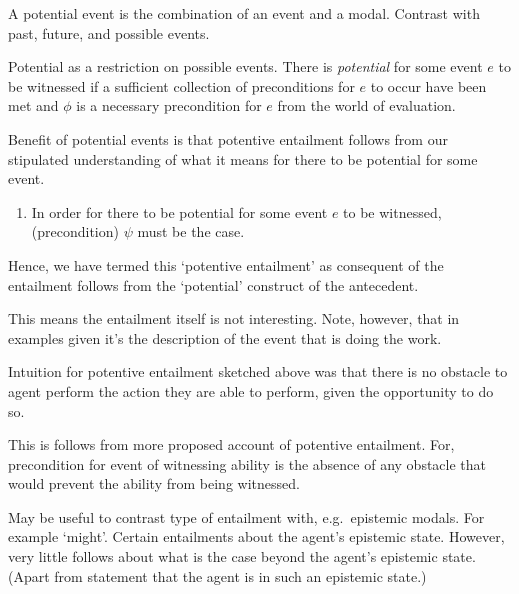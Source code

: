 \begin{note}
  A potential event is the combination of an event and a modal.
  Contrast with past, future, and possible events.

  Potential as a restriction on possible events.
  There is \emph{potential} for some event \(e\) to be witnessed if a sufficient collection of preconditions for \(e\) to occur have been met and \(\phi\) is a necessary precondition for \(e\) from the world of evaluation.
\end{note}

\begin{note}
  Benefit of potential events is that potentive entailment follows from our stipulated understanding of what it means for there to be potential for some event.
  \begin{enumerate}
  \item In order for there to be potential for some event \(e\) to be witnessed, (precondition) \(\psi\) must be the case.
  \end{enumerate}
  Hence, we have termed this `potentive entailment' as consequent of the entailment follows from the `potential' construct of the antecedent.

  This means the entailment itself is not interesting.
  Note, however, that in examples given it's the description of the event that is doing the work.
\end{note}

\begin{note}
  Intuition for potentive entailment sketched above was that there is no obstacle to agent perform the action they are able to perform, given the opportunity to do so.

  This is follows from more proposed account of potentive entailment.
  For, precondition for event of witnessing ability is the absence of any obstacle that would prevent the ability from being witnessed.
\end{note}

\begin{note}
  May be useful to contrast type of entailment with, e.g.\ epistemic modals.
  For example `might'.
  Certain entailments about the agent's epistemic state.
  However, very little follows about what is the case beyond the agent's epistemic state.
  (Apart from statement that the agent is in such an epistemic state.)
\end{note}


